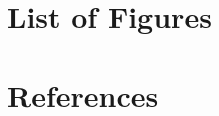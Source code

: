 \documentclass[a4paper,12pt]{article}
\begin{document}
\section{List of Figures}
\renewcommand{\listfigurename}{}
\vskip -1cm
\listoffigures

\renewcommand\refname{\vskip -1cm}
\section{References}


\end{document}
